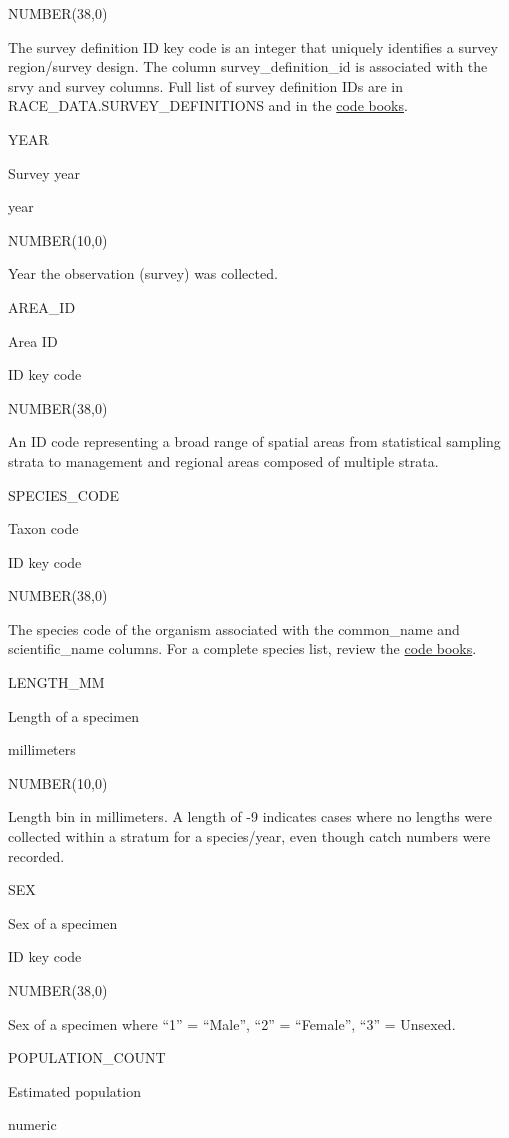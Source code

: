 \documentclass[
  letterpaper,
  oneside,
  open=any]{scrbook}
\begin{document}
NUMBER(38,0)

The survey definition ID key code is an integer that uniquely identifies
a survey region/survey design. The column survey\_definition\_id is
associated with the srvy and survey columns. Full list of survey
definition IDs are in RACE\_DATA.SURVEY\_DEFINITIONS and in the
\href{https://www.fisheries.noaa.gov/resource/document/groundfish-survey-species-code-manual-and-data-codes-manual}{code
books}.

YEAR

Survey year

year

NUMBER(10,0)

Year the observation (survey) was collected.

AREA\_ID

Area ID

ID key code

NUMBER(38,0)

An ID code representing a broad range of spatial areas from statistical
sampling strata to management and regional areas composed of multiple
strata.

SPECIES\_CODE

Taxon code

ID key code

NUMBER(38,0)

The species code of the organism associated with the common\_name and
scientific\_name columns. For a complete species list, review the
\href{https://www.fisheries.noaa.gov/resource/document/groundfish-survey-species-code-manual-and-data-codes-manual}{code
books}.

LENGTH\_MM

Length of a specimen

millimeters

NUMBER(10,0)

Length bin in millimeters. A length of -9 indicates cases where no
lengths were collected within a stratum for a species/year, even though
catch numbers were recorded.

SEX

Sex of a specimen

ID key code

NUMBER(38,0)

Sex of a specimen where ``1'' = ``Male'', ``2'' = ``Female'', ``3'' =
Unsexed.

POPULATION\_COUNT

Estimated population

numeric
\end{document}
